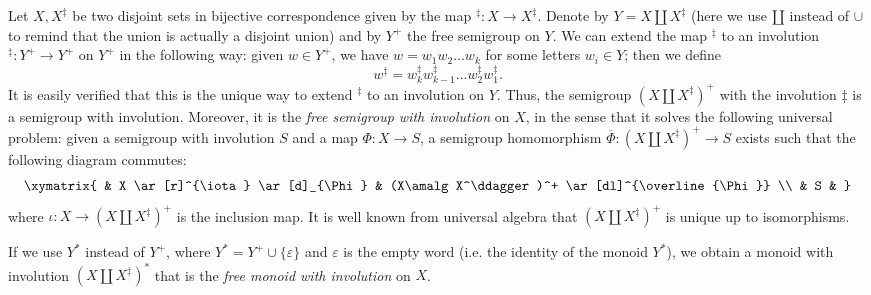 \documentclass[12pt]{article}
\begin{document}
Let $X,X^\ddagger$ be two disjoint sets in bijective correspondence given by the map $^\ddagger:X\rightarrow X^\ddagger$. Denote by $Y=X\amalg X^\ddagger$ (here we use $\amalg$ instead of $\cup$ to remind that the union is actually a disjoint union) and by $Y^+$ the free semigroup on $Y$. We can  extend the map $^\ddagger$ to an involution $^\ddagger:Y^+\rightarrow Y^+$ on $Y^+$ in the following way: given $w\in Y^+$, we have $w=w_1w_2...w_k$ for some letters $w_i\in Y$; then we define $$w^\ddagger=w_k^\ddagger w_{k-1}^\ddagger ... w_{2}^\ddagger w_{1}^\ddagger.$$
It is easily verified that this is the unique way to extend $^\ddagger$ to an involution on $Y$. Thus, the semigroup $(X\amalg X^\ddagger)^+$ with the involution $\ddagger$ is a semigroup with involution. Moreover, it is the \emph{free semigroup with involution} on $X$, in the sense that it solves the following universal problem: given a semigroup with involution $S$ and a map $\Phi:X\rightarrow S$, a semigroup homomorphism $\overline\Phi:(X\amalg X^\ddagger)^+\rightarrow S$ exists such that the following diagram commutes:
$$
\xymatrix{
& X \ar[r]^{\iota} \ar[d]_{\Phi} & (X\amalg X^\ddagger)^+ \ar[dl]^{\overline{\Phi}} \\
& S &
}
$$
where $\iota:X\rightarrow (X\amalg X^\ddagger)^+$ is the inclusion map. It is well known from universal algebra that $(X\amalg X^\ddagger)^+$ is unique up to isomorphisms.

If we use $Y^*$ instead of $Y^+$, where $Y^*=Y^+\cup\{\varepsilon\}$ and $\varepsilon$ is the empty word (i.e. the identity of the monoid $Y^*$), we obtain a monoid with involution $(X\amalg X^\ddagger)^*$ that is the \emph{free monoid with involution} on $X$.
\end{document}
